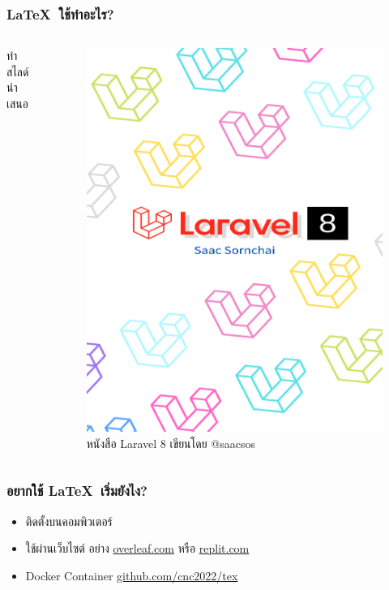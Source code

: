 \documentclass[xetex,serif,aspectratio=1610]{beamer}
\begin{document}
\begin{frame}
\frametitle{\textbf{\LaTeX{}}~ใช้ทำอะไร?}
\begin{columns}[c]
ทำสไลด์นำเสนอ
\begin{figure}
    \includegraphics[width=.55\textwidth]{./pdf/Laravel8-saacsos_cover.pdf}
    \caption*{หนังสือ Laravel 8 เขียนโดย @saacsos}
    \label{fig:presentation-naiithink-slide-making}
\end{figure}
\end{columns}
\end{frame}

\begin{frame}
\frametitle{อยากใช้ \textbf{\LaTeX{}}~เริ่มยังไง?}
\begin{itemize}
    \item ติดตั้งบนคอมพิวเตอร์
    \item ใช้ผ่านเว็บไซต์ อย่าง \href{https://www.overleaf.com/}{overleaf.com} หรือ \href{https://replit.com}{replit.com}
    \item Docker Container \href{https://github.com/cnc2022/tex}{github.com/cnc2022/tex}
\end{itemize}
\end{frame}
\end{document}
